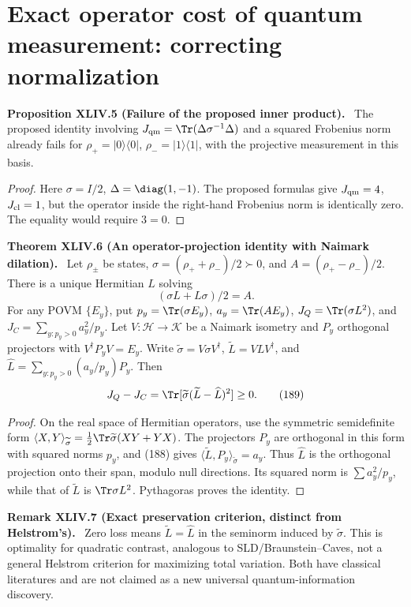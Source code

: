 \documentclass[11pt,a4paper,oneside]{book}
\newcommand{\statement}[3]{\par\medskip\noindent\textbf{#1 #2 (#3).}\ }
\begin{document}
\section{Exact operator cost of quantum measurement: correcting normalization}
\statement{Proposition}{XLIV.5}{Failure of the proposed inner product}
The proposed identity involving $J_{\rm qm}=\Tr(\Delta\sigma^{-1}\Delta)$ and a squared Frobenius norm already fails for $\rho_+=|0\rangle\langle0|$, $\rho_-=|1\rangle\langle1|$, with the projective measurement in this basis.
\begin{proof}
Here $\sigma=I/2$, $\Delta=\diag(1,-1)$. The proposed formulas give $J_{\rm qm}=4$, $J_{\rm cl}=1$, but the operator inside the right-hand Frobenius norm is identically zero. The equality would require $3=0$.
\end{proof}
\statement{Theorem}{XLIV.6}{An operator-projection identity with Naimark dilation}
Let $\rho_\pm$ be states, $\sigma=(\rho_++\rho_-)/2\succ0$, and $A=(\rho_+-\rho_-)/2$. There is a unique Hermitian $L$ solving
\begin{equation}(\sigma L+L\sigma)/2=A.\tag{188}\end{equation}
For any POVM $\{E_y\}$, put $p_y=\Tr(\sigma E_y)$, $a_y=\Tr(AE_y)$, $J_Q=\Tr(\sigma L^2)$, and $J_C=\sum_{y:p_y>0}a_y^2/p_y$. Let $V:\mathcal H\to\mathcal K$ be a Naimark isometry and $P_y$ orthogonal projectors with $V^\dagger P_yV=E_y$. Write $\widetilde\sigma=V\sigma V^\dagger$, $\widetilde L=VLV^\dagger$, and $\widehat L=\sum_{y:p_y>0}(a_y/p_y)P_y$. Then
\begin{equation}J_Q-J_C=\Tr[\widetilde\sigma(\widetilde L-\widehat L)^2]\ge0.\tag{189}\end{equation}
\begin{proof}
On the real space of Hermitian operators, use the symmetric semidefinite form $\langle X,Y\rangle_{\widetilde\sigma}=\tfrac12\Tr\widetilde\sigma(XY+YX)$. The projectors $P_y$ are orthogonal in this form with squared norms $p_y$, and (188) gives $\langle\widetilde L,P_y\rangle_{\widetilde\sigma}=a_y$. Thus $\widehat L$ is the orthogonal projection onto their span, modulo null directions. Its squared norm is $\sum a_y^2/p_y$, while that of $\widetilde L$ is $\Tr\sigma L^2$. Pythagoras proves the identity.
\end{proof}
\statement{Remark}{XLIV.7}{Exact preservation criterion, distinct from Helstrom's}
Zero loss means $\widetilde L=\widehat L$ in the seminorm induced by $\widetilde\sigma$. This is optimality for quadratic contrast, analogous to SLD/Braunstein--Caves, not a general Helstrom criterion for maximizing total variation. Both have classical literatures and are not claimed as a new universal quantum-information discovery.
\end{document}
